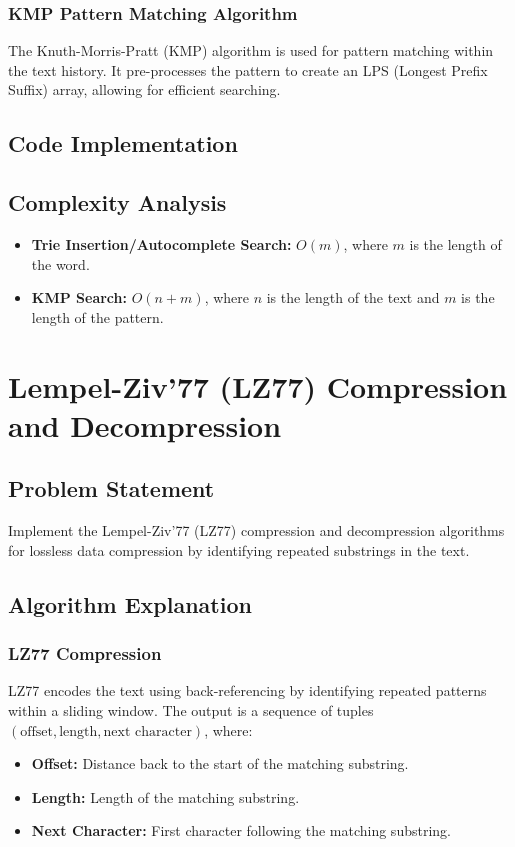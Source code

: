 \documentclass[10pt,a4paper]{report}
\begin{document}
\subsection{KMP Pattern Matching Algorithm}
The Knuth-Morris-Pratt (KMP) algorithm is used for pattern matching within the text history. It pre-processes the pattern to create an LPS (Longest Prefix Suffix) array, allowing for efficient searching.

\section{Code Implementation}


\section{Complexity Analysis}
\begin{itemize}
    \item \textbf{Trie Insertion/Autocomplete Search:} $O(m)$, where $m$ is the length of the word.
    \item \textbf{KMP Search:} $O(n + m)$, where $n$ is the length of the text and $m$ is the length of the pattern.
\end{itemize}

\chapter{Lempel-Ziv'77 (LZ77) Compression and Decompression}
\section{Problem Statement}
Implement the Lempel-Ziv'77 (LZ77) compression and decompression algorithms for lossless data compression by identifying repeated substrings in the text.

\section{Algorithm Explanation}
\subsection{LZ77 Compression}
LZ77 encodes the text using back-referencing by identifying repeated patterns within a sliding window. The output is a sequence of tuples $(\text{offset}, \text{length}, \text{next character})$, where:
\begin{itemize}
    \item \textbf{Offset:} Distance back to the start of the matching substring.
    \item \textbf{Length:} Length of the matching substring.
    \item \textbf{Next Character:} First character following the matching substring.
\end{itemize}
\end{document}
